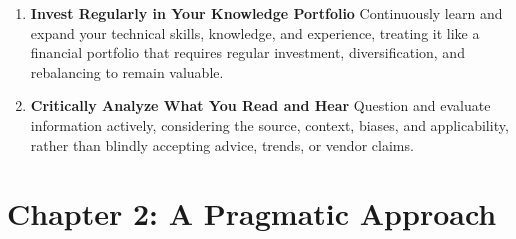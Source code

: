 \documentclass[11pt]{article}
\begin{document}
\begin{enumerate}[label=\arabic*., itemsep=1ex]
    \item \textbf{Invest Regularly in Your Knowledge Portfolio}
    Continuously learn and expand your technical skills, knowledge, and experience, treating it like a financial portfolio that requires regular investment, diversification, and rebalancing to remain valuable.

    \item \textbf{Critically Analyze What You Read and Hear}
    Question and evaluate information actively, considering the source, context, biases, and applicability, rather than blindly accepting advice, trends, or vendor claims.
\end{enumerate}

\newpage %

\section*{Chapter 2: A Pragmatic Approach}
\end{document}
